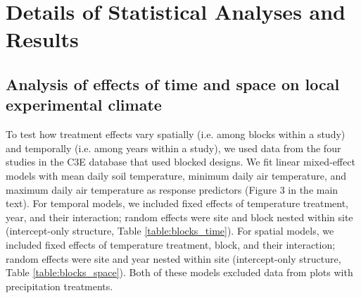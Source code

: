 \documentclass{article}
\begin{document}
\section* {Details of Statistical Analyses and Results}
\subsection* {Analysis of effects of time and space on local experimental climate}
To test how treatment effects vary spatially (i.e. among blocks within a study) and temporally (i.e. among years within a study), we used data from the four studies in the C3E database that used blocked designs. We fit linear mixed-effect models with mean daily soil temperature, minimum daily air temperature, and maximum daily air temperature as response predictors (Figure 3 in the main text). For temporal models, we included fixed effects of temperature treatment, year, and their interaction; random effects were site and block nested within site (intercept-only structure, Table \ref{table:blocks_time}). For spatial models, we included fixed effects of temperature treatment, block, and their interaction; random effects were site and year nested within site (intercept-only structure, Table \ref{table:blocks_space}). Both of these models excluded data from plots with precipitation treatments. 
\end{document}
